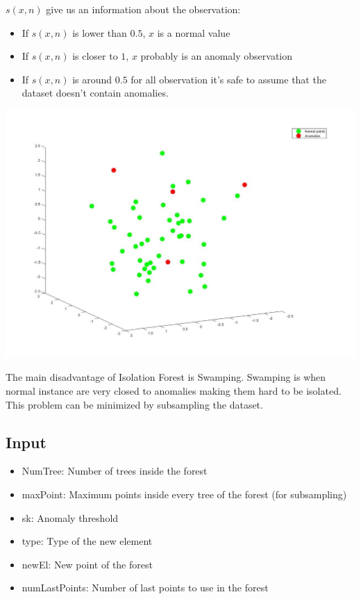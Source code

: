 \documentclass[journal]{IEEEtran}
\begin{document}
\(s(x,n)\) give us an information about the observation:
\begin{itemize}
\item If \(s(x,n)\) is lower than \(0.5\), \(x\) is a normal value
\item If \(s(x,n)\) is closer to \(1\), \(x\) probably is an anomaly observation
\item If \(s(x,n)\) is around \(0.5\) for all observation it's safe to assume that the dataset doesn't contain anomalies.
\end{itemize}

\begin{center}
\includegraphics[width=\columnwidth]{grafico.jpg}
\end{center}

The main disadvantage of Isolation Forest is Swamping. Swamping is when normal instance are very closed to anomalies making them hard to be isolated. This problem can be minimized by subsampling the dataset.

\subsection{Input}
\begin{itemize}
\item NumTree: Number of trees inside the forest 
\item maxPoint: Maximum points inside every tree of the forest (for subsampling)
\item sk: Anomaly threshold 
\item type: Type of the new element 
\item newEl: New point of the forest 
\item numLastPoints: Number of last points to use in the forest
\end{itemize}
\end{document}
